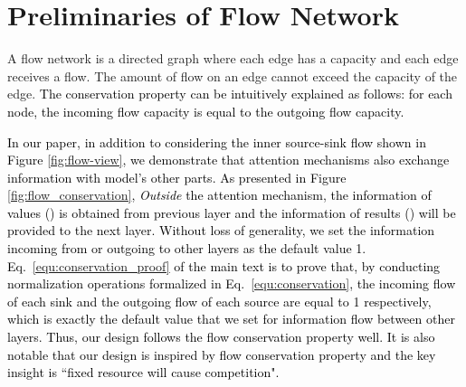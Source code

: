 \documentclass[nohyperref]{article}
\theoremstyle{plain}
\theoremstyle{definition}
\theoremstyle{remark}
\newcommand{\update}[1]{{\textcolor{black}{#1}}}
\begin{document}
\begin{table}[h]
    \vspace{-15pt}
	\caption{Accuracy results (\%) on LRA (averaged from 5 sub-tasks).}
	\vspace{-5pt}
	\label{tab:lra_2x2}
	\vskip 0.1in
	\centering
	\begin{small}
		\begin{sc}
			\renewcommand{\multirowsetup}{\centering}
			\setlength{\tabcolsep}{10pt}
		\end{sc}
	\end{small}
	\vspace{-7pt}
\end{table}


\section{Preliminaries of Flow Network}

A flow network \cite{Ahuja1993NetworkF} is a directed graph where each edge has a capacity and each edge receives a flow. The amount of flow on an edge cannot exceed the capacity of the edge. \update{The conservation property can be intuitively explained as follows: for each node, the incoming flow capacity is equal to the outgoing flow capacity.}

\update{In our paper, in addition to considering the inner source-sink flow shown in Figure \ref{fig:flow-view}, we demonstrate that attention mechanisms also exchange information with model's other parts. As presented in Figure \ref{fig:flow_conservation}, \emph{Outside} the attention mechanism, the information of values () is obtained from previous layer and the information of results () will be provided to the next layer. Without loss of generality, we set the information incoming from or outgoing to other layers as the default value 1. Eq.~\eqref{equ:conservation_proof} of the main text is to prove that, by conducting normalization operations formalized in Eq.~\eqref{equ:conservation}, the incoming flow of each sink and the outgoing flow of each source are equal to 1 respectively, which is exactly the default value that we set for information flow between other layers. Thus, our design follows the flow conservation property well. It is also notable that our design is inspired by flow conservation property and the key insight is ``fixed resource will cause competition".}
\end{document}
